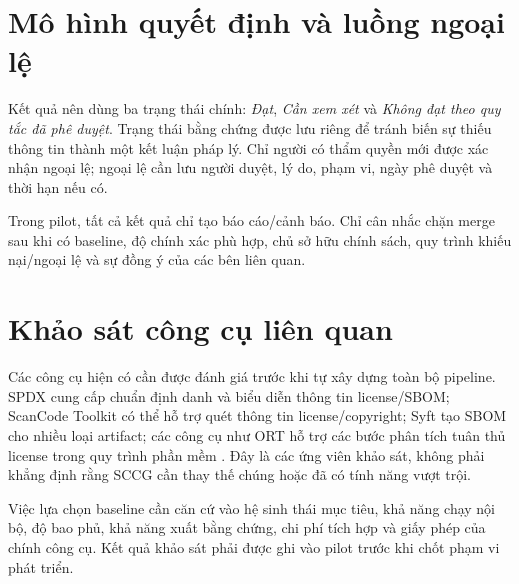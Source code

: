 \section{Mô hình quyết định và luồng ngoại lệ}
Kết quả nên dùng ba trạng thái chính: \textit{Đạt}, \textit{Cần xem xét} và \textit{Không đạt theo quy tắc đã phê duyệt}. Trạng thái bằng chứng được lưu riêng để tránh biến sự thiếu thông tin thành một kết luận pháp lý. Chỉ người có thẩm quyền mới được xác nhận ngoại lệ; ngoại lệ cần lưu người duyệt, lý do, phạm vi, ngày phê duyệt và thời hạn nếu có.

Trong pilot, tất cả kết quả chỉ tạo báo cáo/cảnh báo. Chỉ cân nhắc chặn merge sau khi có baseline, độ chính xác phù hợp, chủ sở hữu chính sách, quy trình khiếu nại/ngoại lệ và sự đồng ý của các bên liên quan.

\section{Khảo sát công cụ liên quan}
Các công cụ hiện có cần được đánh giá trước khi tự xây dựng toàn bộ pipeline. SPDX cung cấp chuẩn định danh và biểu diễn thông tin license/SBOM; ScanCode Toolkit có thể hỗ trợ quét thông tin license/copyright; Syft tạo SBOM cho nhiều loại artifact; các công cụ như ORT hỗ trợ các bước phân tích tuân thủ license trong quy trình phần mềm \cite{spdx,scancode,syft,ort}. Đây là các ứng viên khảo sát, không phải khẳng định rằng SCCG cần thay thế chúng hoặc đã có tính năng vượt trội.

Việc lựa chọn baseline cần căn cứ vào hệ sinh thái mục tiêu, khả năng chạy nội bộ, độ bao phủ, khả năng xuất bằng chứng, chi phí tích hợp và giấy phép của chính công cụ. Kết quả khảo sát phải được ghi vào pilot trước khi chốt phạm vi phát triển.
